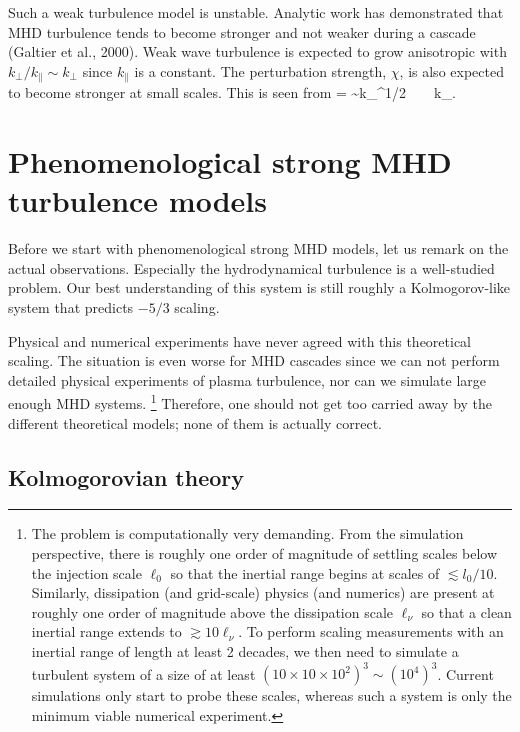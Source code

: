 \documentclass[usenatbib,twocolumn, twocolappendix]{aastex63}
\begin{document}
Such a weak turbulence model is unstable.
Analytic work has demonstrated that MHD turbulence tends to become stronger and not weaker during a cascade (Galtier et al., 2000).
Weak wave turbulence is expected to grow anisotropic with $k_\perp/k_\parallel \sim k_\perp$ since $k_\parallel$ is a constant.
The perturbation strength, $\chi$, is also expected to become stronger at small scales.
This is seen from
\be
\chi =  \sim k_\perp^{1/2} \rightarrow \infty ~ ~ k_\perp \rightarrow \infty.
\ee



\section{Phenomenological strong MHD turbulence models}\label{sect:theory}

Before we start with phenomenological strong MHD models, let us remark on the actual observations.
Especially the hydrodynamical turbulence is a well-studied problem.
Our best understanding of this system is still roughly a Kolmogorov-like system that predicts $-5/3$ scaling.

Physical and numerical experiments have never agreed with this theoretical scaling.
The situation is even worse for MHD cascades since we can not perform detailed physical experiments of plasma turbulence, nor can we simulate large enough MHD systems.%
\footnote{
    The problem is computationally very demanding.
From the simulation perspective, there is roughly one order of magnitude of settling scales below the injection scale $\ell_0$ so that the inertial range begins at scales of $\lesssim l_0/10$.
Similarly, dissipation (and grid-scale) physics (and numerics) are present at roughly one order of magnitude above the dissipation scale $\ell_\nu$ so that a clean inertial range extends to $\gtrsim 10 \ell_\nu$.
To perform scaling measurements with an inertial range of length at least 2 decades, we then need to simulate a turbulent system of a size of at least $(10\times10\times10^2)^3 \sim (10^4)^3$.
Current simulations only start to probe these scales, whereas such a system is only the minimum viable numerical experiment.
}
Therefore, one should not get too carried away by the different theoretical models;
none of them is actually correct.


\subsection{Kolmogorovian theory}\label{sect:K41}
\end{document}
